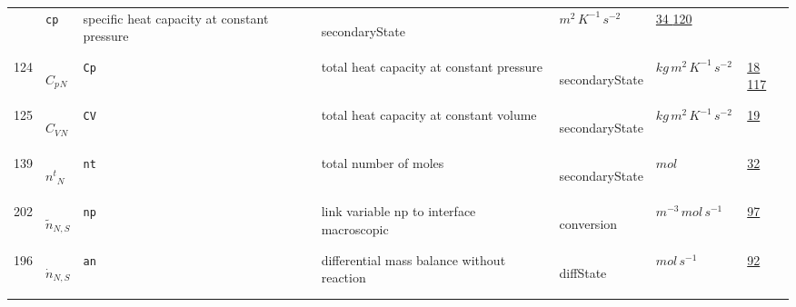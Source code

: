 \begin{longtable}{|p{1cm}|p{2.5cm}|p{4.5cm}|p{8cm}|p{3.0cm}|p{3cm}|p{1cm}|}
             & \verb|cp|
             & specific heat capacity at constant pressure
             & \begin{lay}secondaryState \end{lay}
             & $ m^{2} \,K^{-1} \,s^{-2} \, $
             &                 \hyperlink{"e:34"}{ 34 }
                                 \hyperlink{"e:120"}{ 120 }
                 \\
            124
             & \hypertarget{"v:124"}{ $ {{C_p}}{_{N}} $}
             & \verb|Cp|
             & total heat capacity at constant pressure
             & \begin{lay}secondaryState \end{lay}
             & $ kg \,m^{2} \,K^{-1} \,s^{-2} \, $
             &                 \hyperlink{"e:18"}{ 18 }
                                 \hyperlink{"e:117"}{ 117 }
                 \\
            125
             & \hypertarget{"v:125"}{ $ {{C_V}}{_{N}} $}
             & \verb|CV|
             & total heat capacity at constant volume
             & \begin{lay}secondaryState \end{lay}
             & $ kg \,m^{2} \,K^{-1} \,s^{-2} \, $
             &                 \hyperlink{"e:19"}{ 19 }
                 \\
            139
             & \hypertarget{"v:139"}{ $ {{n^t}}{_{N}} $}
             & \verb|nt|
             & total number of moles
             & \begin{lay}secondaryState \end{lay}
             & $ mol \, $
             &                 \hyperlink{"e:32"}{ 32 }
                 \\
            202
             & \hypertarget{"v:202"}{ $ {{\tilde{n}}}{_{N, S}} $}
             & \verb|np|
             & link variable  np to interface macroscopic
             & \begin{lay}conversion \end{lay}
             & $ m^{-3} \,mol \,s^{-1} \, $
             &                 \hyperlink{"e:97"}{ 97 }
                 \\
            196
             & \hypertarget{"v:196"}{ $ {{\dot{n}}}{_{N, S}} $}
             & \verb|an|
             & differential mass balance without reaction
             & \begin{lay}diffState \end{lay}
             & $ mol \,s^{-1} \, $
             &                 \hyperlink{"e:92"}{ 92 }

\end{longtable}

